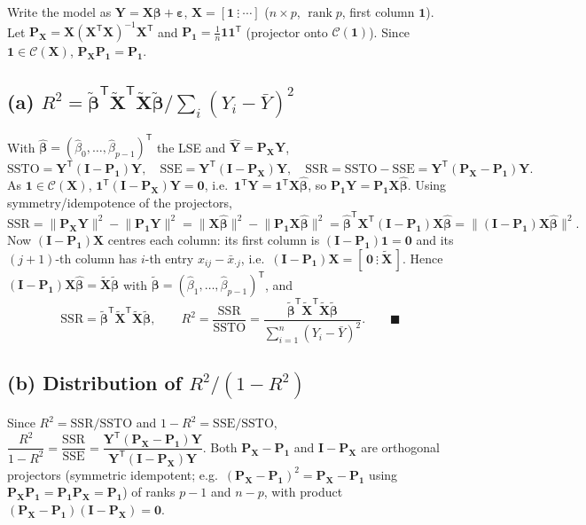 \documentclass[11pt]{article}
\DeclareMathOperator{\rank}{rank}
\newcommand{\Cs}{\mathcal{C}}
\newcommand{\bX}{\mathbf{X}}
\newcommand{\bY}{\mathbf{Y}}
\newcommand{\bI}{\mathbf{I}}
\newcommand{\bP}{\mathbf{P}}
\newcommand{\bzero}{\mathbf{0}}
\newcommand{\bone}{\mathbf{1}}
\newcommand{\bbeta}{\bm{\beta}}
\newcommand{\beps}{\bm{\varepsilon}}
\newcommand{\Xt}{\widetilde{\bX}}
\newcommand{\bbt}{\widetilde{\bm{\beta}}}
\newcommand{\T}{^{\mathsf{T}}}
\newcommand{\inv}{^{-1}}
\newcommand{\bhat}[1]{\widehat{#1}}
\theoremstyle{remark}
\begin{document}
Write the model as $\bY=\bX\bbeta+\beps$, $\bX=[\bone\ \vdots\ \cdots]$ ($n\times p$, $\rank p$, first column
$\bone$). Let $\bP_{\bX}=\bX(\bX\T\bX)\inv\bX\T$ and $\bP_{\bone}=\tfrac1n\bone\bone\T$ (projector onto
$\Cs(\bone)$). Since $\bone\in\Cs(\bX)$, $\bP_{\bX}\bP_{\bone}=\bP_{\bone}$.

\subsection*{(a) $R^2=\bbt\T\Xt\T\Xt\bbt\big/\sum_i(Y_i-\bar Y)^2$}

With $\bhat{\bbeta}=(\hat\beta_0,\dots,\hat\beta_{p-1})\T$ the LSE and $\bhat\bY=\bP_{\bX}\bY$,
\[
\mathrm{SSTO}=\bY\T(\bI-\bP_{\bone})\bY,\quad \mathrm{SSE}=\bY\T(\bI-\bP_{\bX})\bY,\quad
\mathrm{SSR}=\mathrm{SSTO}-\mathrm{SSE}=\bY\T(\bP_{\bX}-\bP_{\bone})\bY.
\]
As $\bone\in\Cs(\bX)$, $\bone\T(\bI-\bP_{\bX})\bY=\bzero$, i.e.\ $\bone\T\bY=\bone\T\bX\bhat{\bbeta}$, so
$\bP_{\bone}\bY=\bP_{\bone}\bX\bhat{\bbeta}$. Using symmetry/idempotence of the projectors,
\[
\mathrm{SSR}=\lVert\bP_{\bX}\bY\rVert^2-\lVert\bP_{\bone}\bY\rVert^2
=\lVert\bX\bhat{\bbeta}\rVert^2-\lVert\bP_{\bone}\bX\bhat{\bbeta}\rVert^2
=\bhat{\bbeta}\T\bX\T(\bI-\bP_{\bone})\bX\bhat{\bbeta}
=\big\lVert(\bI-\bP_{\bone})\bX\bhat{\bbeta}\big\rVert^2.
\]
Now $(\bI-\bP_{\bone})\bX$ centres each column: its first column is
$(\bI-\bP_{\bone})\bone=\bzero$ and its $(j{+}1)$-th column has $i$-th entry $x_{ij}-\bar x_{\cdot j}$, i.e.\
$(\bI-\bP_{\bone})\bX=[\,\bzero\ \vdots\ \Xt\,]$. Hence
$(\bI-\bP_{\bone})\bX\bhat{\bbeta}=\Xt\bbt$ with $\bbt=(\hat\beta_1,\dots,\hat\beta_{p-1})\T$, and
\[
\mathrm{SSR}=\bbt\T\Xt\T\Xt\bbt,\qquad
R^2=\frac{\mathrm{SSR}}{\mathrm{SSTO}}=\frac{\bbt\T\Xt\T\Xt\bbt}{\sum_{i=1}^n(Y_i-\bar Y)^2}.\qquad\blacksquare
\]

\subsection*{(b) Distribution of $R^2/(1-R^2)$}

Since $R^2=\mathrm{SSR}/\mathrm{SSTO}$ and $1-R^2=\mathrm{SSE}/\mathrm{SSTO}$,
$\dfrac{R^2}{1-R^2}=\dfrac{\mathrm{SSR}}{\mathrm{SSE}}
=\dfrac{\bY\T(\bP_{\bX}-\bP_{\bone})\bY}{\bY\T(\bI-\bP_{\bX})\bY}$. Both
$\bP_{\bX}-\bP_{\bone}$ and $\bI-\bP_{\bX}$ are orthogonal projectors (symmetric idempotent; e.g.\
$(\bP_{\bX}-\bP_{\bone})^2=\bP_{\bX}-\bP_{\bone}$ using $\bP_{\bX}\bP_{\bone}=\bP_{\bone}\bP_{\bX}=\bP_{\bone}$)
of ranks $p-1$ and $n-p$, with product
$(\bP_{\bX}-\bP_{\bone})(\bI-\bP_{\bX})=\bzero$.
\end{document}
